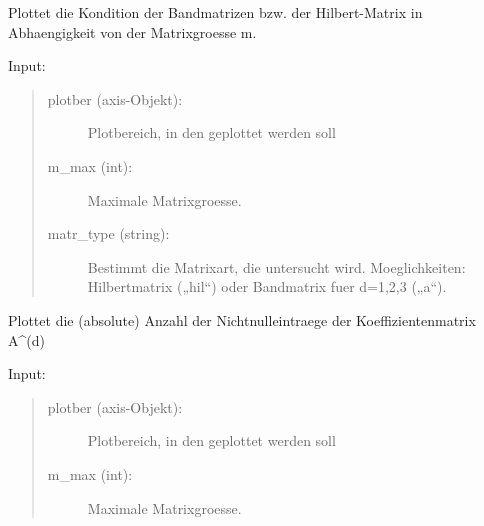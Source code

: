 \documentclass[letterpaper,10pt,ngerman]{sphinxmanual}
\begin{document}
\begin{fulllineitems}
\label{\detokenize{index:aufg_3_4_main.plot_kond}}
Plottet die Kondition der Bandmatrizen bzw. der Hilbert-Matrix in Abhaengigkeit von der
Matrixgroesse m.

Input:
\begin{quote}
\begin{description}
\item[{plotber (axis-Objekt):}] \leavevmode
Plotbereich, in den geplottet werden soll

\item[{m\_max (int):}] \leavevmode
Maximale Matrixgroesse.

\item[{matr\_type (string):}] \leavevmode
Bestimmt die Matrixart, die untersucht wird.
Moeglichkeiten: Hilbertmatrix („hil“) oder
Bandmatrix fuer d=1,2,3 („a“).

\end{description}
\end{quote}

\end{fulllineitems}


\begin{fulllineitems}
\label{\detokenize{index:aufg_3_4_main.plot_nn}}
Plottet die (absolute) Anzahl der Nichtnulleintraege der Koeffizientenmatrix A\textasciicircum{}(d)

Input:
\begin{quote}
\begin{description}
\item[{plotber (axis-Objekt):}] \leavevmode
Plotbereich, in den geplottet werden soll

\item[{m\_max (int):}] \leavevmode
Maximale Matrixgroesse.

\end{description}
\end{quote}

\end{fulllineitems}

\end{document}
